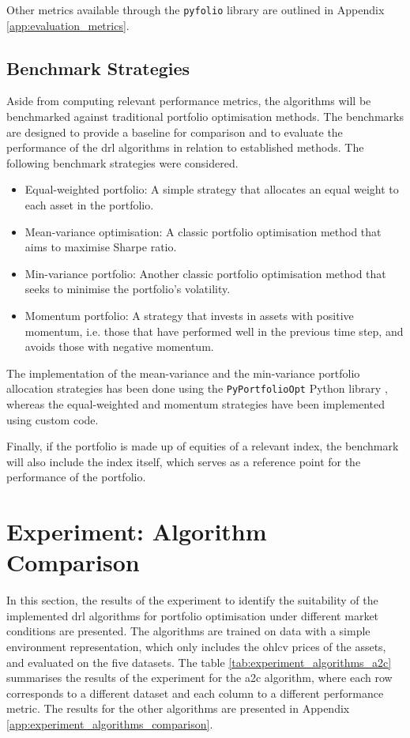 Other metrics available through the \texttt{pyfolio} library are outlined in Appendix \ref{app:evaluation_metrics}.

\subsection{Benchmark Strategies} \label{sec:benchmark-strategies}

Aside from computing relevant performance metrics, the algorithms will be benchmarked against traditional portfolio optimisation methods. The benchmarks are designed to provide a baseline for comparison and to evaluate the performance of the \acrshort{drl} algorithms in relation to established methods. The following benchmark strategies were considered.
\begin{itemize}
    \item Equal-weighted portfolio: A simple strategy that allocates an equal weight to each asset in the portfolio.
    \item Mean-variance optimisation: A classic portfolio optimisation method that aims to maximise Sharpe ratio.
    \item Min-variance portfolio: Another classic portfolio optimisation method that seeks to minimise the portfolio's volatility.
    \item Momentum portfolio: A strategy that invests in assets with positive momentum, i.e. those that have performed well in the previous time step, and avoids those with negative momentum.
\end{itemize}

The implementation of the mean-variance and the min-variance portfolio allocation strategies has been done using the \texttt{PyPortfolioOpt} Python library \cite{Martin2021}, whereas the equal-weighted and momentum strategies have been implemented using custom code.

Finally, if the portfolio is made up of equities of a relevant index, the benchmark will also include the index itself, which serves as a reference point for the performance of the portfolio. 

\section{Experiment: Algorithm Comparison} \label{sec:exp-algorithm-comparison}

In this section, the results of the experiment to identify the suitability of the implemented \acrshort{drl} algorithms for portfolio optimisation under different market conditions are presented. The algorithms are trained on data with a simple environment representation, which only includes the \acrshort{ohlcv} prices of the assets, and evaluated on the five datasets. The table \ref{tab:experiment_algorithms_a2c} summarises the results of the experiment for the \acrshort{a2c} algorithm, where each row corresponds to a different dataset and each column to a different performance metric. The results for the other algorithms are presented in Appendix \ref{app:experiment_algorithms_comparison}.

